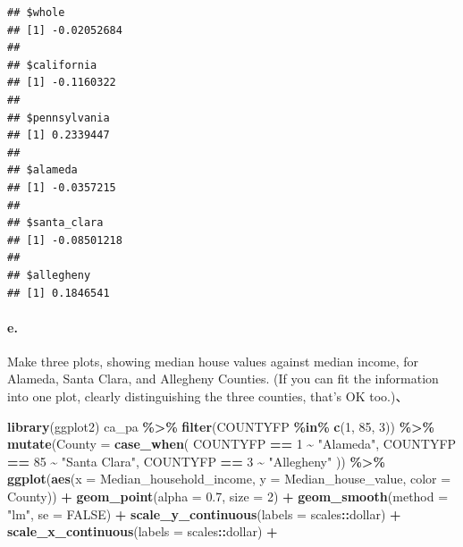 \documentclass[
]{article}
\newenvironment{Shaded}{\begin{snugshade}}{\end{snugshade}}
\newcommand{\AttributeTok}[1]{\textcolor[rgb]{0.13,0.29,0.53}{#1}}
\newcommand{\ConstantTok}[1]{\textcolor[rgb]{0.56,0.35,0.01}{#1}}
\newcommand{\DecValTok}[1]{\textcolor[rgb]{0.00,0.00,0.81}{#1}}
\newcommand{\FloatTok}[1]{\textcolor[rgb]{0.00,0.00,0.81}{#1}}
\newcommand{\FunctionTok}[1]{\textcolor[rgb]{0.13,0.29,0.53}{\textbf{#1}}}
\newcommand{\NormalTok}[1]{#1}
\newcommand{\SpecialCharTok}[1]{\textcolor[rgb]{0.81,0.36,0.00}{\textbf{#1}}}
\newcommand{\StringTok}[1]{\textcolor[rgb]{0.31,0.60,0.02}{#1}}
\begin{document}
\begin{verbatim}
## $whole
## [1] -0.02052684
## 
## $california
## [1] -0.1160322
## 
## $pennsylvania
## [1] 0.2339447
## 
## $alameda
## [1] -0.0357215
## 
## $santa_clara
## [1] -0.08501218
## 
## $allegheny
## [1] 0.1846541
\end{verbatim}

\paragraph{e.}\label{e.-1}

Make three plots, showing median house values against median income, for
Alameda, Santa Clara, and Allegheny Counties. (If you can fit the
information into one plot, clearly distinguishing the three counties,
that's OK too.)、

\begin{Shaded}
\begin{Highlighting}[]
\FunctionTok{library}\NormalTok{(ggplot2)}
\NormalTok{ca\_pa }\SpecialCharTok{\%\textgreater{}\%}
  \FunctionTok{filter}\NormalTok{(COUNTYFP }\SpecialCharTok{\%in\%} \FunctionTok{c}\NormalTok{(}\DecValTok{1}\NormalTok{, }\DecValTok{85}\NormalTok{, }\DecValTok{3}\NormalTok{)) }\SpecialCharTok{\%\textgreater{}\%}
  \FunctionTok{mutate}\NormalTok{(}\AttributeTok{County =} \FunctionTok{case\_when}\NormalTok{(}
\NormalTok{    COUNTYFP }\SpecialCharTok{==} \DecValTok{1} \SpecialCharTok{\textasciitilde{}} \StringTok{"Alameda"}\NormalTok{,}
\NormalTok{    COUNTYFP }\SpecialCharTok{==} \DecValTok{85} \SpecialCharTok{\textasciitilde{}} \StringTok{"Santa Clara"}\NormalTok{,}
\NormalTok{    COUNTYFP }\SpecialCharTok{==} \DecValTok{3} \SpecialCharTok{\textasciitilde{}} \StringTok{"Allegheny"}
\NormalTok{  )) }\SpecialCharTok{\%\textgreater{}\%}
  \FunctionTok{ggplot}\NormalTok{(}\FunctionTok{aes}\NormalTok{(}\AttributeTok{x =}\NormalTok{ Median\_household\_income, }\AttributeTok{y =}\NormalTok{ Median\_house\_value, }\AttributeTok{color =}\NormalTok{ County)) }\SpecialCharTok{+}
  \FunctionTok{geom\_point}\NormalTok{(}\AttributeTok{alpha =} \FloatTok{0.7}\NormalTok{, }\AttributeTok{size =} \DecValTok{2}\NormalTok{) }\SpecialCharTok{+}
  \FunctionTok{geom\_smooth}\NormalTok{(}\AttributeTok{method =} \StringTok{"lm"}\NormalTok{, }\AttributeTok{se =} \ConstantTok{FALSE}\NormalTok{) }\SpecialCharTok{+}
  \FunctionTok{scale\_y\_continuous}\NormalTok{(}\AttributeTok{labels =}\NormalTok{ scales}\SpecialCharTok{::}\NormalTok{dollar) }\SpecialCharTok{+}
  \FunctionTok{scale\_x\_continuous}\NormalTok{(}\AttributeTok{labels =}\NormalTok{ scales}\SpecialCharTok{::}\NormalTok{dollar) }\SpecialCharTok{+}

\end{Highlighting}
\end{Shaded}
\end{document}
